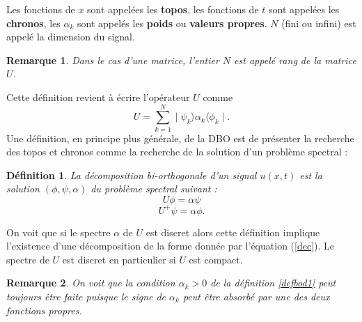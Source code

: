 \documentclass{book}
\newtheorem{defn}{D\'efinition}[chapter]
\newtheorem{rem}{Remarque}[chapter]
\begin{document}
Les fonctions de $x$ sont appel\'ees les {\bf topos}, les fonctions
de $t$ sont appel\'ees les {\bf chronos}, les $\alpha_k$ sont
appel\'es les {\bf poids} ou {\bf valeurs propres}.
$N$ (fini ou infini) est appel\'e la dimension du signal.

\begin{rem}
Dans le cas d'une matrice, l'entier $N$ est appel\'e rang de la matrice
$U$. 
\end{rem}
Cette d\'efinition revient \`a \'ecrire l'op\'erateur $U$ comme
\begin{equation}
U=\sum_{k=1}^{N}\mid \psi_k\rangle \alpha_k\langle \phi_k\mid .
\end{equation}
Une d\'efinition, en principe plus g\'en\'erale, de la DBO est de 
pr\'esenter la recherche des topos et
chronos comme la recherche de la solution d'un probl\`eme spectral :

\begin{defn}\label{defbod2}
La d\'ecomposition bi-orthogonale d'un signal $u(x,t)$
est la solution $(\phi,\psi,\alpha)$
 du probl\`eme spectral suivant :
\begin{equation}
U\phi=\alpha\psi
\end{equation}
\begin{equation}
U^+\psi=\alpha\phi.
\end{equation}
\end{defn}

On voit que si le spectre $\alpha$ de $U$ est discret
alors cette d\'efinition implique l'existence d'une d\'ecomposition
de la forme donn\'ee par l'\'equation (\ref{dec}).
Le spectre de $U$ est discret en particulier si $U$ est compact.

\begin{rem}
On voit que la condition $\alpha_k>0$ de la d\'efinition
\ref{defbod1} peut toujours \^etre
faite puisque  le signe de $\alpha_k$ peut \^etre absorb\'e par une des
deux fonctions propres. 
\end{rem}
\end{document}
